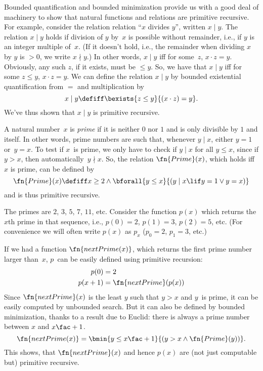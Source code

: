 \documentclass[../../../include/open-logic-section]{subfiles}
\begin{document}

Bounded quantification and bounded minimization provide us with a good
deal of machinery to show that natural functions and relations are
primitive recursive. For example, consider the relation relation ``$x$
divides $y$'', written $x \mid y$.  The relation $x \mid y$ holds if
division of $y$ by~$x$ is possible without remainder, i.e., if $y$ is
an integer multiple of~$x$.  (If it doesn't hold, i.e., the remainder
when dividing $x$ by $y$ is $> 0$, we write $x \nmid y$.) In other
words, $x \mid y$ iff for some~$z$, $x \cdot z = y$.  Obviously, any
such $z$, if it exists, must be $\leq y$. So, we have that $x \mid y$
iff for some $z \le y$, $x \cdot z = y$.  We can define the relation
$x \mid y$ by bounded existential quantification from $=$ and
multiplication by
\[
x \mid y \defiff \bexists{z \leq y}{(x \cdot z) = y}.
\]
We've thus shown that $x \mid y$ is primitive recursive.

A natural number~$x$ is \emph{prime} if it is neither $0$ nor $1$ and
is only divisible by $1$ and itself. In other words, prime numbers are
such that, whenever $y \mid x$, either $y = 1$ or~$y=x$.  To test if
$x$~is prime, we only have to check if $y \mid x$ for all $y \le x$,
since if $y > x$, then automatically~$y \nmid x$.  So, the relation
$\fn{Prime}(x)$, which holds iff $x$ is prime, can be defined by
\[
\fn{Prime}(x) \defiff x \geq 2 \land \bforall{y \leq x}{(y \mid x \lif y
  = 1 \lor y = x)}
\]
and is thus primitive recursive.

The primes are $2$, $3$, $5$, $7$, $11$, etc. Consider the function
$p(x)$ which returns the $x$th prime in that sequence, i.e., $p(0) =
2$, $p(1) = 3$, $p(2) = 5$, etc. (For convenience we will often write
$p(x)$ as $p_x$ ($p_0=2$, $p_1=3$, etc.)

If we had a function
$\fn{nextPrime(x)}$, which returns the first prime number larger
than~$x$, $p$~can be easily defined using primitive recursion:
\begin{align*}
  p(0) & = 2\\
  p(x+1) & = \fn{nextPrime}(p(x))
\end{align*}
Since $\fn{nextPrime}(x)$ is the least $y$ such that $y > x$ and
$y$~is prime, it can be easily computed by unbounded search. But it
can also be defined by bounded minimization, thanks to a result due to
Euclid: there is always a prime number between $x$ and $x\fac+1$.
\[
  \fn{nextPrime(x)} =
  \bmin{y \leq x\fac+1}{(y > x \land \fn{Prime}(y))}.
\]
This shows, that $\fn{nextPrime}(x)$ and hence $p(x)$ are (not just
computable but) primitive recursive.
\end{document}
